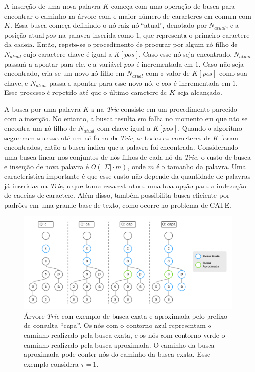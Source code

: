 A inserção de uma nova palavra $K$ começa com uma operação de busca para encontrar o caminho na árvore com o maior número de caracteres em comum com $K$. Essa busca começa definindo o nó raiz nó ``atual'', denotado por $N_{atual}$, e a posição atual $pos$ na palavra inserida como $1$, que representa o primeiro caractere da cadeia. Então, repete-se o procedimento de procurar por algum nó filho de $N_{atual}$ cujo caractere chave é igual a $K[pos]$. Caso esse nó seja encontrado, $N_{atual}$ passará a apontar para ele, e a variável $pos$ é incrementada em $1$. Caso não seja encontrado, cria-se um novo nó filho em $N_{atual}$ com o valor de $K[pos]$ como sua chave, e $N_{atual}$ passa a apontar para esse novo nó, e $pos$ é incrementada em $1$. Esse processo é repetido até que o último caractere de $K$ seja alcançado.

A busca por uma palavra $K$ a na \textit{Trie} consiste em um procedimento parecido com a inserção. No entanto, a busca resulta em falha no momento em que não se encontra um nó filho de $N_{atual}$ com chave igual a $K[pos]$. Quando o algoritmo segue com sucesso até um nó folha da \textit{Trie}, se todos os caracteres de $K$ foram encontrados, então a busca indica que a palavra foi encontrada. Considerando uma busca linear nos conjuntos de nós filhos de cada nó da \textit{Trie}, o custo de busca e inserção de nova palavra é $O(|\Sigma| \cdot m)$, onde $m$ é o tamanho da palavra. Uma característica importante é que esse custo não depende da quantidade de palavras já inseridas na \textit{Trie}, o que torna essa estrutura uma boa opção para a indexação de cadeias de caractere. Além disso, também possibilita busca eficiente por padrões em uma grande base de texto, como ocorre no problema de CATE.

\begin{figure}[ht]
    \centering
    \includegraphics[width=1\textwidth]{figures/trie_exact_and_approximate_search.png}
    \caption{Árvore \textit{Trie} com exemplo de busca exata e aproximada pelo prefixo de consulta ``capa''. Os nós com o contorno azul representam o caminho realizado pela busca exata, e os nós com contorno verde o caminho realizado pela busca aproximada. O caminho da busca aproximada pode conter nós do caminho da busca exata. Esse exemplo considera $\tau = 1$. }
    \label{fig:exact_and_approximate_search_trie}
\end{figure}

